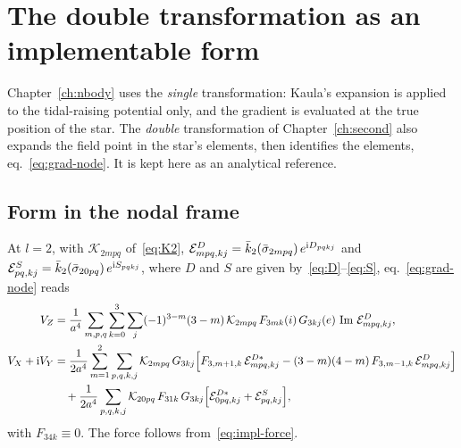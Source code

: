 \chapter{The double transformation as an implementable form}\label{app:double}

Chapter~\ref{ch:nbody} uses the \emph{single} transformation: Kaula's expansion is applied to the tidal-raising potential only, and the gradient is evaluated at the true position of the star. The \emph{double} transformation of Chapter~\ref{ch:second} also expands the field point in the star's elements, then identifies the elements, eq.~\eqref{eq:grad-node}. It is kept here as an analytical reference.

\section{Form in the nodal frame}
At $l=2$, with $\mathcal K_{2mpq}$ of~\eqref{eq:K2}, $\mathcal E^{D}_{mpq,kj}=\bar k_2(\bar\sigma_{2mpq})\,e^{\mathrm{i} D_{pqkj}}$ and $\mathcal E^{S}_{pq,kj}=\bar k_2(\bar\sigma_{20pq})\,e^{\mathrm{i} S_{pqkj}}$, where $D$ and $S$ are given by~\eqref{eq:D}--\eqref{eq:S}, eq.~\eqref{eq:grad-node} reads
\begin{equation}
  \begin{aligned}
  V_Z&=\frac{1}{a^4}\sum_{m,p,q}\sum_{k=0}^{3}\sum_{j}(-1)^{3-m}(3-m)\,\mathcal K_{2mpq}\,F_{3mk}(i)\,G_{3kj}(e)\,\operatorname{Im}\,\mathcal E^{D}_{mpq,kj},\\
  V_X+\mathrm{i} V_Y&=\frac{1}{2a^4}\sum_{m=1}^{2}\sum_{p,q,k,j}\mathcal K_{2mpq}\,G_{3kj}\Big[F_{3,m+1,k}\,\mathcal E^{D*}_{mpq,kj}-(3-m)(4-m)\,F_{3,m-1,k}\,\mathcal E^{D}_{mpq,kj}\Big]\\
  &\quad+\frac{1}{2a^4}\sum_{p,q,k,j}\mathcal K_{20pq}\,F_{31k}\,G_{3kj}\Big[\mathcal E^{D*}_{0pq,kj}+\mathcal E^{S}_{pq,kj}\Big],
  \end{aligned} \label{eq:impl-double}
\end{equation}
with $F_{34k}\equiv0$. The force follows from~\eqref{eq:impl-force}.

